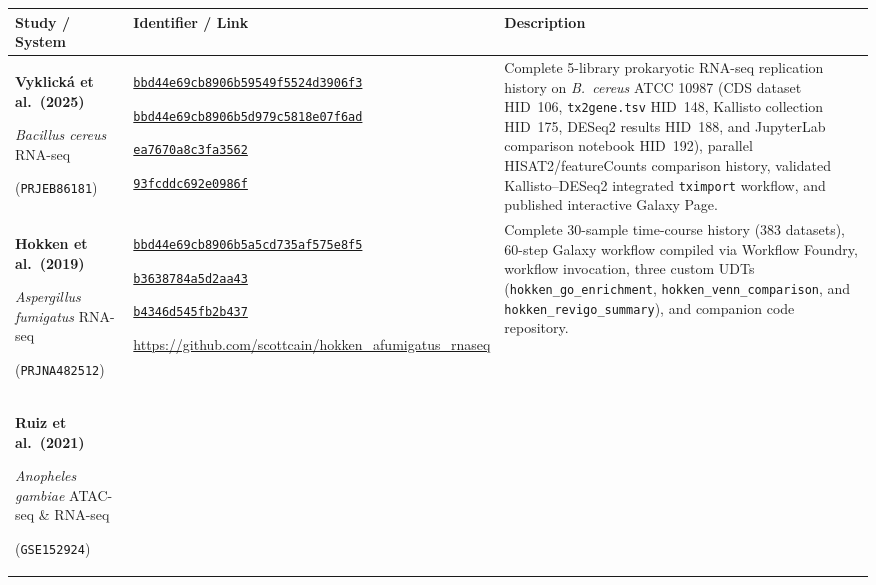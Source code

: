 \documentclass[11pt,letterpaper]{article}
\begin{document}
\begin{table}[!htbp]
\centering
\scriptsize
\renewcommand{\arraystretch}{0.95}
\begin{tabularx}{\textwidth}{p{3.0cm}p{4.8cm}X}
\toprule
\textbf{Study / System} & \textbf{Identifier / Link} & \textbf{Description} \\
\midrule
\textbf{Vyklick{\'a} et al.\ (2025)} \par \textit{Bacillus cereus} RNA-seq \par (\texttt{PRJEB86181}) &
\href{https://usegalaxy.org/histories/view?id=bbd44e69cb8906b59549f5524d3906f3}{\texttt{bbd44e69cb8906b59549f5524d3906f3}} \par
\href{https://usegalaxy.org/histories/view?id=bbd44e69cb8906b5d979c5818e07f6ad}{\texttt{bbd44e69cb8906b5d979c5818e07f6ad}} \par
\href{https://usegalaxy.org/published/workflow?id=ea7670a8c3fa3562}{\texttt{ea7670a8c3fa3562}} \par
\href{https://usegalaxy.org/published/page?id=93fcddc692e0986f}{\texttt{93fcddc692e0986f}} &
Complete 5-library prokaryotic RNA-seq replication history on \textit{B.\ cereus} ATCC 10987 (CDS dataset HID~106, \texttt{tx2gene.tsv} HID~148, Kallisto collection HID~175, DESeq2 results HID~188, and JupyterLab comparison notebook HID~192), parallel HISAT2/featureCounts comparison history, validated Kallisto--DESeq2 integrated \texttt{tximport} workflow, and published interactive Galaxy Page. \\
\addlinespace
\textbf{Hokken et al.\ (2019)} \par \textit{Aspergillus fumigatus} RNA-seq \par (\texttt{PRJNA482512}) &
\href{https://usegalaxy.org/histories/view?id=bbd44e69cb8906b5a5cd735af575e8f5}{\texttt{bbd44e69cb8906b5a5cd735af575e8f5}} \par
\href{https://usegalaxy.org/published/workflow?id=b3638784a5d2aa43}{\texttt{b3638784a5d2aa43}} \par
\href{https://usegalaxy.org/workflows/invocations/b4346d545fb2b437}{\texttt{b4346d545fb2b437}} \par
\url{https://github.com/scottcain/hokken_afumigatus_rnaseq} &
Complete 30-sample time-course history (383 datasets), 60-step Galaxy workflow compiled via Workflow Foundry, workflow invocation, three custom UDTs (\texttt{hokken\_go\_enrichment}, \texttt{hokken\_venn\_comparison}, and \texttt{hokken\_revigo\_summary}), and companion code repository. \\
\addlinespace
\textbf{Ruiz et al.\ (2021)} \par \textit{Anopheles gambiae} ATAC-seq \& RNA-seq \par (\texttt{GSE152924}) &

\end{tabularx}
\end{table}
\end{document}
